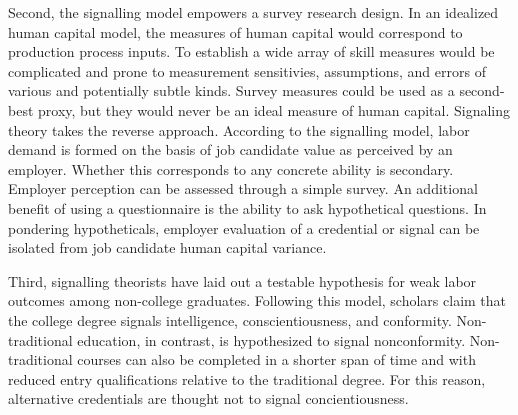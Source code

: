 \documentclass[review]{elsarticle}
\begin{document}
Second, the signalling model empowers a survey research design.
In an idealized human capital model, the measures of human capital would correspond to production process inputs.
To establish a wide array of skill measures would be complicated and prone to measurement sensitivies, assumptions, and errors of various and potentially subtle kinds.
Survey measures could be used as a second-best proxy, but they would never be an ideal measure of human capital.
Signaling theory takes the reverse approach.
According to the signalling model, labor demand is formed on the basis of job candidate value as perceived by an employer.
Whether this corresponds to any concrete ability is secondary.
Employer perception can be assessed through a simple survey.
An additional benefit of using a questionnaire is the ability to ask hypothetical questions.
In pondering hypotheticals, employer evaluation of a credential or signal can be isolated from job candidate human capital variance.

Third, signalling theorists have laid out a testable hypothesis for weak labor outcomes among non-college graduates.
Following this model, scholars claim that the college degree signals intelligence, conscientiousness, and conformity\cite{caplan2018case}.
Non-traditional education, in contrast, is hypothesized to signal nonconformity.
Non-traditional courses can also be completed in a shorter span of time and with reduced entry qualifications relative to the traditional degree.
For this reason, alternative credentials are thought not to signal concientiousness.



\end{document}
